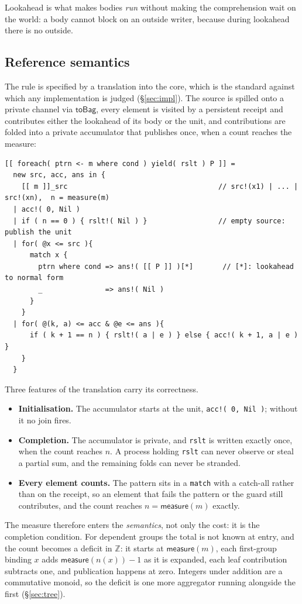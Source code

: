 \documentclass[11pt]{article}
\theoremstyle{branddef}
\theoremstyle{brandplain}
\theoremstyle{brandrem}
\newcommand{\meas}{\mathsf{measure}}
\begin{document}
Lookahead is what makes bodies \emph{run} without making the comprehension
wait on the world: a body cannot block on an outside writer, because during
lookahead there is no outside.

\subsection{Reference semantics}
\label{sec:refsem}

The rule is specified by a translation into the core, which is the standard
against which any implementation is judged (\S\ref{sec:impl}). The source is
spilled onto a private channel via \(\mathsf{toBag}\), every element is
visited by a persistent receipt and contributes either the lookahead of its
body or the unit, and contributions are folded into a private accumulator that
publishes once, when a count reaches the measure:
\begin{lstlisting}
[[ foreach( ptrn <- m where cond ) yield( rslt ) P ]] =
  new src, acc, ans in {
    [[ m ]]_src                                    // src!(x1) | ... | src!(xn),  n = measure(m)
  | acc!( 0, Nil )
  | if ( n == 0 ) { rslt!( Nil ) }                 // empty source: publish the unit
  | for( @x <= src ){
      match x {
        ptrn where cond => ans!( [[ P ]] )[*]       // [*]: lookahead to normal form
        _               => ans!( Nil )
      }
    }
  | for( @(k, a) <= acc & @e <= ans ){
      if ( k + 1 == n ) { rslt!( a | e ) } else { acc!( k + 1, a | e ) }
    }
  }
\end{lstlisting}
Three features of the translation carry its correctness.
\begin{itemize}[nosep]
\item \textbf{Initialisation.} The accumulator starts at the unit,
\texttt{acc!( 0, Nil )}; without it no join fires.
\item \textbf{Completion.} The accumulator is private, and \texttt{rslt} is
written exactly once, when the count reaches \(n\). A process holding
\texttt{rslt} can never observe or steal a partial sum, and the remaining folds
can never be stranded.
\item \textbf{Every element counts.} The pattern sits in a \texttt{match} with a
catch-all rather than on the receipt, so an element that fails the pattern or
the guard still contributes, and the count reaches \(n =\meas(m)\) exactly.
\end{itemize}
The measure therefore enters the \emph{semantics}, not only the cost: it is the
completion condition. For dependent groups the total is not known at entry, and
the count becomes a deficit in \(\mathbb{Z}\): it starts at \(\meas(m)\), each
first-group binding \(x\) adds \(\meas(n(x)) - 1\) as it is expanded, each leaf
contribution subtracts one, and publication happens at zero. Integers under
addition are a commutative monoid, so the deficit is one more aggregator
running alongside the first (\S\ref{sec:tree}).
\end{document}
